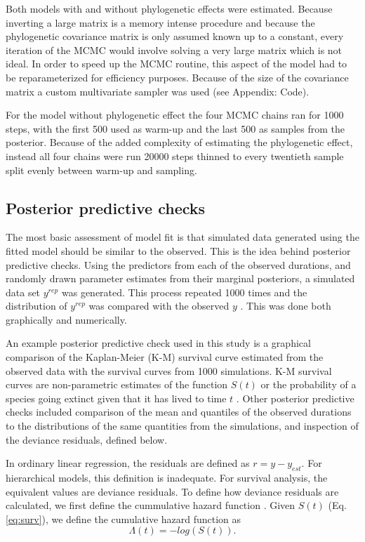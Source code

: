\documentclass[12pt,letterpaper]{article}
\begin{document}
Both models with and without phylogenetic effects were estimated. Because inverting a large matrix is a memory intense procedure and because the phylogenetic covariance matrix is only assumed known up to a constant, every iteration of the MCMC would involve solving a very large matrix which is not ideal. In order to speed up the MCMC routine, this aspect of the model had to be reparameterized for efficiency purposes. Because of the size of the covariance matrix a custom multivariate sampler was used (see Appendix: Code).

For the model without phylogenetic effect the four MCMC chains ran for 1000 steps, with the first 500 used as warm-up and the last 500 as samples from the posterior. Because of the added complexity of estimating the phylogenetic effect, instead all four chains were run 20000 steps thinned to every twentieth sample split evenly between warm-up and sampling. 



\subsection{Posterior predictive checks}

The most basic assessment of model fit is that simulated data generated using the fitted model should be similar to the observed. This is the idea behind posterior predictive checks. Using the predictors from each of the observed durations, and randomly drawn parameter estimates from their marginal posteriors, a simulated data set \(y^{rep}\) was generated. This process repeated 1000 times and the distribution of \(y^{rep}\) was compared with the observed \(y\) \citep{Gelman2013d}. This was done both graphically and numerically.

An example posterior predictive check used in this study is a graphical comparison of the Kaplan-Meier (K-M) survival curve estimated from the observed data with the survival curves from 1000 simulations. K-M survival curves are non-parametric estimates of the function \(S(t)\) or the probability of a species going extinct given that it has lived to time \(t\) \citep{Klein2003}. Other posterior predictive checks included comparison of the mean and quantiles of the observed durations to the distributions of the same quantities from the simulations, and inspection of the deviance residuals, defined below.

In ordinary linear regression, the residuals are defined as \(r = y - y_{est}\). For hierarchical models, this definition is inadequate. For survival analysis, the equivalent values are deviance residuals. To define how deviance residuals are calculated, we first define the cummulative hazard function \citep{Klein2003}. Given \(S(t)\) (Eq. \ref{eq:surv}), we define the cumulative hazard function as 
\begin{equation*}
  \Lambda(t) = -log\left(S\left(t\right)\right).
\end{equation*}
\end{document}
